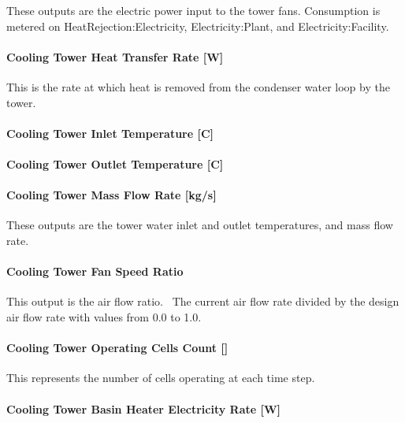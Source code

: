 These outputs are the electric power input to the tower fans. Consumption is metered on HeatRejection:Electricity, Electricity:Plant, and Electricity:Facility.

\paragraph{Cooling Tower Heat Transfer Rate {[}W{]}}\label{cooling-tower-heat-transfer-rate-w-2}

This is the rate at which heat is removed from the condenser water loop by the tower.

\paragraph{Cooling Tower Inlet Temperature {[}C{]}}\label{cooling-tower-inlet-temperature-c-2}

\paragraph{Cooling Tower Outlet Temperature {[}C{]}}\label{cooling-tower-outlet-temperature-c-2}

\paragraph{Cooling Tower Mass Flow Rate {[}kg/s{]}}\label{cooling-tower-mass-flow-rate-kgs-2}

These outputs are the tower water inlet and outlet temperatures, and mass flow rate.

\paragraph{Cooling Tower Fan Speed Ratio}\label{cooling-tower-fan-speed-ratio}

This output is the air flow ratio.~ The current air flow rate divided by the design air flow rate with values from 0.0 to 1.0.

\paragraph{Cooling Tower Operating Cells Count {[]}}\label{cooling-tower-operating-cells-count-2}

This represents the number of cells operating at each time step.

\paragraph{Cooling Tower Basin Heater Electricity Rate {[}W{]}}\label{cooling-tower-basin-heater-electric-power-w-2}

